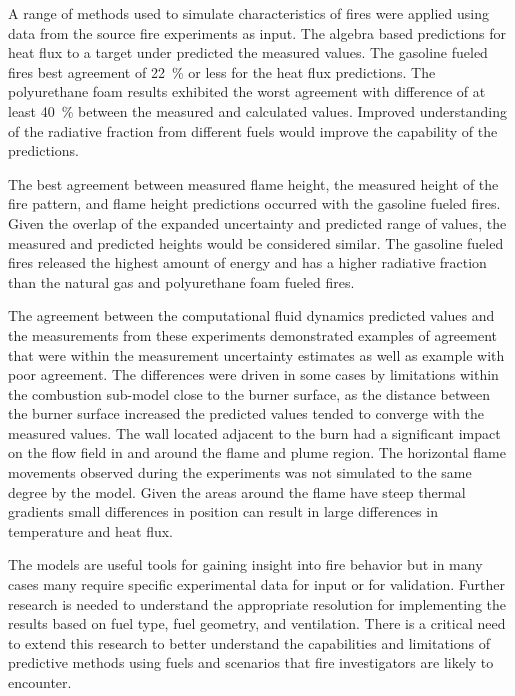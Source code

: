 \documentclass[twoside]{uocthesis}
\begin{document}
{A range of methods used to simulate characteristics of fires were applied using data from the source fire experiments as input.  The algebra based predictions for heat flux to a target under predicted the measured values.  The gasoline fueled fires best agreement of 22~\% or less for the heat flux predictions.  The polyurethane foam results exhibited the worst agreement with difference of at least 40~\% between the measured and calculated values.  Improved understanding of the radiative fraction from different fuels would improve the capability of the predictions.  

The best agreement between measured flame height, the measured height of the fire pattern, and flame height predictions occurred with the gasoline fueled fires.  Given the overlap of the expanded uncertainty and predicted range of values, the measured and predicted heights would be considered similar.  The gasoline fueled fires released the highest amount of energy and has a higher radiative fraction than the natural gas and polyurethane foam fueled fires.  

The agreement between the computational fluid dynamics predicted values and the measurements from these experiments demonstrated examples of agreement that were within the measurement uncertainty estimates as well as example with poor agreement.  The differences were driven in some cases by limitations within the combustion sub-model close to the burner surface, as the distance between the burner surface increased the predicted values tended to converge with the measured values.  The wall located adjacent to the burn had a significant impact on the flow field in and around the flame and plume region.  The horizontal flame movements observed during the experiments was not simulated to the same degree by the model.  Given the areas around the flame have steep thermal gradients small differences in position can result in large differences in temperature and heat flux.      

The models are useful tools for gaining insight into fire behavior but in many cases many require specific experimental data for input or for validation.  Further research is needed to understand the appropriate resolution for implementing the results based on fuel type, fuel geometry, and ventilation.  There is a critical need to extend this research to better understand the capabilities and limitations of predictive methods using fuels and scenarios that fire investigators are likely to encounter.  

}
\end{document}
